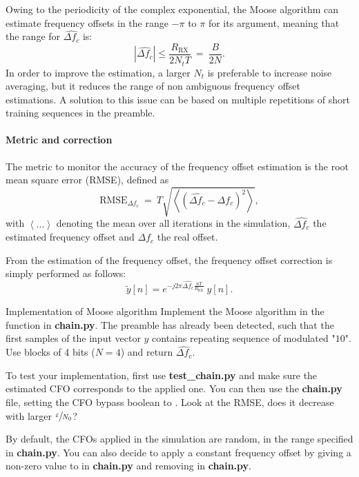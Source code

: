 Owing to the periodicity of the complex exponential, the Moose algorithm can estimate frequency offsets in the range $-\pi$ to $\pi$ for its argument, meaning that the range for $\widehat{\Delta f_c}$ is:
\begin{equation*}
    |\widehat{\Delta f_c}| \leq \frac{R_{\text{RX}}}{2N_tT}\:=\:\frac{B}{2N}.
\end{equation*}
In order to improve the estimation, a larger $N_t$ is preferable to increase noise averaging, but it reduces the range of non ambiguous frequency offset estimations. A solution to this issue can be based on multiple repetitions of short training sequences in the preamble.

\paragraph{Metric and correction}
The metric to monitor the accuracy of the frequency offset estimation is the root mean square error (RMSE), defined as
\begin{equation*}
    \text{RMSE}_{\Delta f_c}\:=\:T\sqrt{\left\langle\left(\widehat{\Delta f_c}-\Delta f_c\right)^2\right\rangle},
\end{equation*}
with $\left\langle ... \right\rangle$ denoting the mean over all iterations in the simulation, $\widehat{\Delta f_c}$ the estimated frequency offset and $\Delta f_c$ the real offset.

From the estimation of the frequency offset, the frequency offset correction is simply performed as follows:
\begin{equation*}
    \tilde{y}[n] = e^{-j2\pi \widehat{\Delta f_c} \frac{nT}{R_{\text{RX}}}}\:y[n].
\end{equation*}


\begin{bclogo}[couleur = gray!20, arrondi = 0.2, logo=\bccrayon]{Implementation of Moose algorithm}
Implement the Moose algorithm in the  function in \textbf{chain.py}. The preamble has already been detected, such that the first samples of the input vector $y$ contains repeating sequence of modulated "$10$". Use blocks of 4 bits ($N=4$) and return $\widehat{\Delta f_c}$.

To test your implementation, first use \textbf{test\_chain.py} and make sure the estimated CFO corresponds to the applied one. You can then use the \textbf{chain.py} file, setting the CFO bypass boolean to . Look at the RMSE, does it decrease with larger $\sfrac{\varepsilon}{N_0}$?

By default, the CFOs applied in the simulation are random, in the range specified in \textbf{chain.py}. You can also decide to apply a constant frequency offset by giving a non-zero value to  in \textbf{chain.py} and removing  in \textbf{chain.py}.
\end{bclogo}



